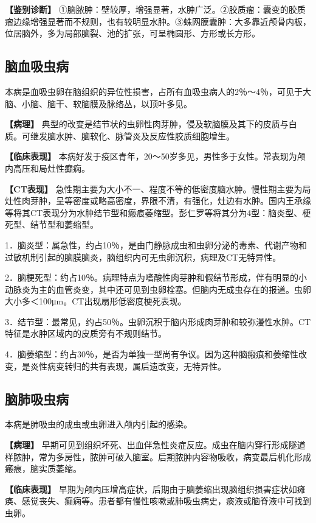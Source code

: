 \textbf{【鉴别诊断】}
①脑脓肿：壁较厚，增强显著，水肿广泛。②胶质瘤：囊变的胶质瘤边缘增强显著而不规则，也有较明显水肿。③蛛网膜囊肿：大多靠近颅骨内板，位居脑外，多为局部脑裂、池的扩张，可呈椭圆形、方形或长方形。

\subsection{脑血吸虫病}

本病是血吸虫卵在脑组织的异位性损害，占所有血吸虫病人的2％～4％，可见于大脑、小脑、脑干、软脑膜及脉络丛，以顶叶多见。

\textbf{【病理】}
典型的改变是结节状的虫卵性肉芽肿，侵及软脑膜及其下的皮质与白质。可继发脑水肿、脑软化、脉管炎及反应性胶质细胞增生。

\textbf{【临床表现】}
本病好发于疫区青年，20～50岁多见，男性多于女性。常表现为颅内高压和局灶性癫痫。

\textbf{【CT表现】}
急性期主要为大小不一、程度不等的低密度脑水肿。慢性期主要为局灶性肉芽肿，呈等密度或略高密度，界限不清，有强化，灶边有水肿。国内王承缘等将其CT表现分为水肿结节型和瘢痕萎缩型。彭仁罗等将其分为4型：脑炎型、梗死型、结节型和萎缩型。

1．脑炎型：属急性，约占10％，是由门静脉成虫和虫卵分泌的毒素、代谢产物和过敏机制引起的脑膜脑炎，脑组织内可无虫卵沉积，病理及CT无特异性。

2．脑梗死型：约占10％。病理特点为嗜酸性肉芽肿和假结节形成，伴有明显的小动脉炎为主的血管炎变，其中还可见到虫卵栓塞。但脑内无成虫存在的报道。虫卵大小多＜100μm。CT出现扇形低密度梗死表现。

3．结节型：最常见，约占50％。虫卵沉积于脑内形成肉芽肿和较弥漫性水肿。CT特征是水肿区域内的皮质旁有不规则结节。

4．脑萎缩型：约占30％，是否为单独一型尚有争议。因为这种脑瘢痕和萎缩性改变，是炎性病变转归的共有表现，属后遗改变，无特异性。

\subsection{脑肺吸虫病}

本病是肺吸虫的成虫或虫卵进入颅内引起的感染。

\textbf{【病理】}
早期可见到组织坏死、出血伴急性炎症反应。成虫在脑内穿行形成隧道样脓肿，常为多房性，脓肿可破入脑室。后期脓肿内容物吸收，病变最后机化形成瘢痕，脑实质萎缩。

\textbf{【临床表现】}
早期为颅内压增高症状，后期由于脑萎缩出现脑组织损害症状如瘫痪、感觉丧失、癫痫等。患者都有慢性咳嗽或肺吸虫病史，痰液或脑脊液中可找到虫卵。

